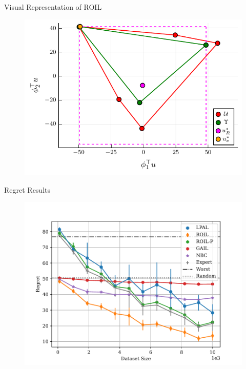 \documentclass[final,a0paper]{beamer}
\begin{document}
\begin{frame}{}
\begin{columns}[t]
\begin{column}{0.3\linewidth}
    \begin{block}{Visual Representation of ROIL}
        \begin{center}
            \begin{figure}
                \begin{center}
                    \includegraphics[scale=1.8]{../../pres_roil/plots/visual_solve_cheb.pdf}
                \end{center}
            \end{figure}
        \end{center}
    \end{block}

    \begin{block}{Regret Results}
        \begin{center}
            \begin{figure}
                \includegraphics[scale=1.2]{../../pres_roil/plots/regrets/40x40_gridworld_on_policy_regret_regrets.pdf}
            \end{figure}
        \end{center}
    \end{block}
  \end{column}


\end{columns}
\end{frame}
\end{document}
